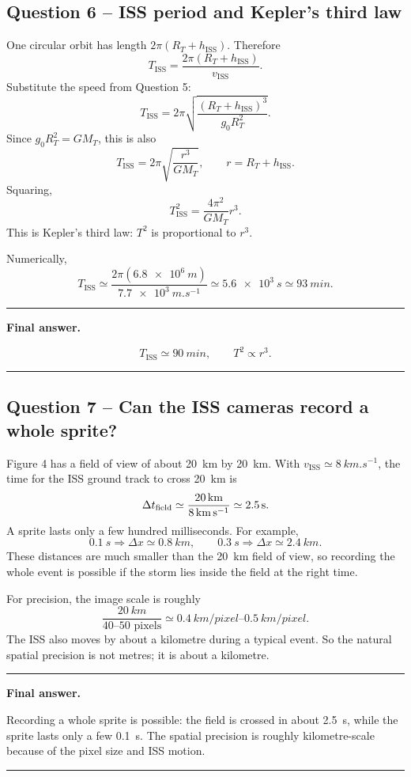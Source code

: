 \documentclass[11pt,a4paper]{article}
\newenvironment{finalanswer}{%
  \begin{center}\begin{minipage}{0.94\linewidth}\hrule\vspace{0.45em}\textbf{Final answer. }%
}{%
  \vspace{0.45em}\hrule\end{minipage}\end{center}%
}
\newcommand{\RT}{R_T}
\newcommand{\ISS}{\mathrm{ISS}}
\begin{document}
\subsection*{Question 6 -- ISS period and Kepler's third law}

One circular orbit has length $2\pi(\RT+h_{\ISS})$. Therefore
\[
 T_{\ISS}=\frac{2\pi(\RT+h_{\ISS})}{v_{\ISS}}.
\]
Substitute the speed from Question 5:
\[
 T_{\ISS}=2\pi\sqrt{\frac{(\RT+h_{\ISS})^3}{g_0\RT^2}}.
\]
Since $g_0\RT^2=G M_T$, this is also
\[
 T_{\ISS}=2\pi\sqrt{\frac{r^3}{G M_T}},\qquad r=\RT+h_{\ISS}.
\]
Squaring,
\[
 T_{\ISS}^2=\frac{4\pi^2}{G M_T}r^3.
\]
This is Kepler's third law: $T^2$ is proportional to $r^3$.

Numerically,
\[
 T_{\ISS}\simeq \frac{2\pi(\SI{6.8e6}{m})}{\SI{7.7e3}{m.s^{-1}}}
 \simeq\SI{5.6e3}{s}
 \simeq\SI{93}{min}.
\]

\begin{finalanswer}
\[
T_{\ISS}\simeq\SI{90}{min},\qquad T^2\propto r^3.
\]
\end{finalanswer}

\subsection*{Question 7 -- Can the ISS cameras record a whole sprite?}

Figure 4 has a field of view of about \SI{20}{km} by \SI{20}{km}. With $v_{\ISS}\simeq\SI{8}{km.s^{-1}}$, the time for the ISS ground track to cross \SI{20}{km} is
\[
 \Delta t_{\rm field}\simeq \frac{\SI{20}{km}}{\SI{8}{km.s^{-1}}}\simeq\SI{2.5}{s}.
\]
A sprite lasts only a few hundred milliseconds. For example,
\[
\SI{0.1}{s}\Rightarrow \Delta x\simeq\SI{0.8}{km},
\qquad
\SI{0.3}{s}\Rightarrow \Delta x\simeq\SI{2.4}{km}.
\]
These distances are much smaller than the \SI{20}{km} field of view, so recording the whole event is possible if the storm lies inside the field at the right time.

For precision, the image scale is roughly
\[
 \frac{\SI{20}{km}}{40\text{--}50\text{ pixels}}\simeq \SIrange{0.4}{0.5}{km/pixel}.
\]
The ISS also moves by about a kilometre during a typical event. So the natural spatial precision is not metres; it is about a kilometre.

\begin{finalanswer}
Recording a whole sprite is possible: the field is crossed in about \SI{2.5}{s}, while the sprite lasts only a few \SI{0.1}{s}. The spatial precision is roughly kilometre-scale because of the pixel size and ISS motion.
\end{finalanswer}
\end{document}
